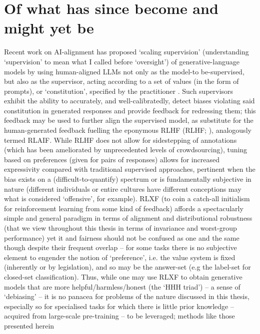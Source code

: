 \section*{Of what has since become and might yet be}
%
%
Recent work on AI-alignment has proposed `scaling supervision' (understanding `supervision' to mean
what I called before `oversight') of generative-language models by using human-aligned LLMs not
only as the model-to be-supervised, but also as the supervisor, acting according to a set of values
(in the form of prompts), or `constitution', specified by the practitioner
\citep{bowman2022measuring, bai2022constitutional}.
%
Such supervisors exhibit the ability to accurately, and well-calibratedly, detect biases violating
said constitution in generated responses and provide feedback for redressing them; this feedback
may be used to further align the supervised model, as substitute for the human-generated feedback
fuelling the eponymous \acl{RLHF} (\acs{RLHF}; \cite{christiano2017deep, stiennon2020learning,
bai2022training}), analogously termed \acf{RLAIF}.
%
While \ac{RLHF} does not allow for sidestepping of annotations (which has been ameliorated by
unprecedented levels of crowdsourcing), tuning based on preferences (given for pairs of responses)
allows for increased expressivity compared with traditional supervised approaches, pertinent when
the bias exists on a (difficult-to-quantify) spectrum or is fundamentally subjective in nature
(different individuals or entire cultures have different conceptions may what is considered
`offensive', for example).
%
RLXF (to coin a catch-all initialism for reinforcement learning from some kind of feedback) affords
a spectacularly simple and general paradigm in terms of alignment and distributional robustness
(that we view throughout this thesis in terms of invariance and worst-group performance) yet it and
fairness should not be confused as one and the same though despite their frequent overlap -- for
some tasks there is no subjective element to engender the notion of `preference', i.e. the value
system is fixed (inherently or by legislation), and so may be the answer-set (e.g the label-set for
closed-set classification). 
%
Thus, while one may use RLXF to obtain generative models that are more helpful/harmless/honest (the
`HHH triad') -- a sense of `debiasing' -- it is no panacea for problems of the nature discussed in
this thesis, especially so for specialised tasks for which there is little prior knowledge --
acquired from large-scale pre-training -- to be leveraged; methods like those presented herein

